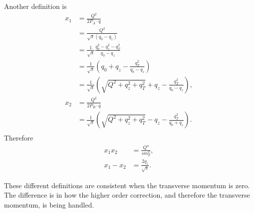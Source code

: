 \documentclass[../main.tex]{subfiles}
\begin{document}
Another definition is
\begin{equation}
    \begin{split}
        x_1 &= \frac{Q^2}{2P_A \cdot q}\\
            &= \frac{Q^2}{\sqrt{s}(q_0-q_z)}\\
            &= \frac{1}{\sqrt{s}}\frac{q_0^2 -q_z^2 -q_T^2}{q_0-q_z} \\
            &= \frac{1}{\sqrt{s}} \left(q_0+q_z -\frac{q_T^2}{q_0-q_z}\right)\\
            &= \frac{1}{\sqrt{s}}\left(\sqrt{Q^2+q_z^2+q_T^2}+q_z -\frac{q_T^2}{q_0-q_z}\right),\\
        x_2 &= \frac{Q^2}{2P_B \cdot q}\\
            &= \frac{1}{\sqrt{s}}\left(\sqrt{Q^2+q_z^2+q_T^2}-q_z -\frac{q_T^2}{q_0+q_z}\right).\\
    \end{split}
\end{equation}
Therefore
\begin{equation}
    \begin{split}
        x_1x_2 &= \frac{Q^4}{s m_T^2}, \\
        x_1-x_2 &= \frac{2q_z}{\sqrt{s}}.
    \end{split}
\end{equation}

These different definitions are consistent when the transverse momentum is zero.
The difference is in how the higher order correction, and therefore the transverse momentum,
is being handled. 
\end{document}

